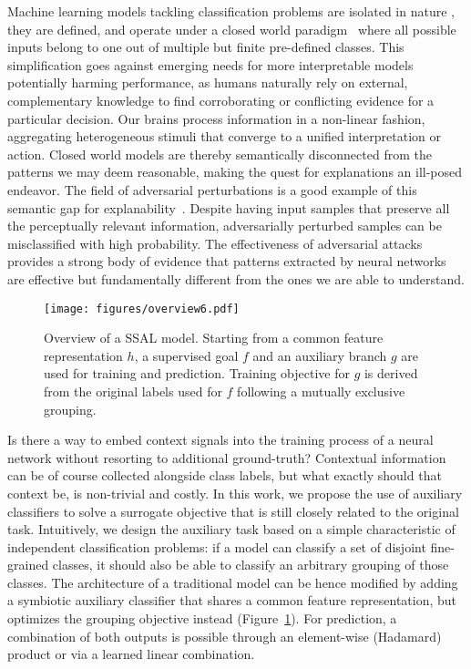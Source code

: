 \documentclass[10pt,twocolumn,letterpaper]{article}
\begin{document}
Machine learning models tackling classification problems are isolated in nature \ie, they are defined, and operate under a closed world paradigm~\cite{bendale2015towards} where all possible inputs belong to one out of multiple but finite pre-defined classes.
This simplification goes against emerging needs for more interpretable models~\cite{doshi2017towards,rudin2019stop} potentially harming performance, as humans naturally rely on external, complementary knowledge to find corroborating or conflicting evidence for a particular decision.
Our brains process information in a non-linear fashion, aggregating heterogeneous stimuli that converge to a unified interpretation or action.
Closed world models are thereby semantically disconnected from the patterns we may deem reasonable, making the quest for explanations an ill-posed endeavor.
The field of adversarial perturbations is a good example of this semantic gap for explanability~\cite{szegedy2013intriguing}.
Despite having input samples that preserve all the perceptually relevant information, adversarially perturbed samples can be misclassified with high probability.
The effectiveness of adversarial attacks provides a strong body of evidence that patterns extracted by neural networks are effective but fundamentally different from the ones we are able to understand.

\begin{figure}[t]
\centering
    \texttt{[image: figures/overview6.pdf]}
	\caption{Overview of a SSAL model. Starting from a common feature representation $h$, a supervised goal $f$ and an auxiliary branch $g$ are used for training and prediction. Training objective for $g$ is derived from the original labels used for $f$ following a mutually exclusive grouping.}
	\label{fig:overview}
\end{figure}

Is there a way to embed context signals into the training process of a neural network without resorting to additional ground-truth?
Contextual information can be of course collected alongside class labels, but what exactly should that context be, is non-trivial and costly.
In this work, we propose the use of auxiliary classifiers to solve a surrogate objective that is still closely related to the original task.
Intuitively, we design the auxiliary task based on a simple characteristic of independent classification problems: if a model can classify a set of disjoint fine-grained classes, it should also be able to classify an arbitrary grouping of those classes.
The architecture of a traditional model can be hence modified by adding a symbiotic auxiliary classifier that shares a common feature representation, but optimizes the grouping objective instead (Figure~\ref{fig:overview}).
For prediction, a combination of both outputs is possible through an element-wise (Hadamard) product or via a learned linear combination.
\end{document}
